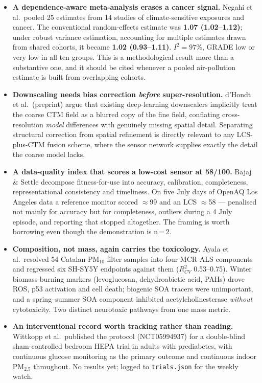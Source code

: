 \documentclass[10pt]{article}
\begin{document}
\footnotesize
\begin{itemize}
\item \textbf{A dependence-aware meta-analysis erases a cancer signal.} Negahi et al.\
pooled 25 estimates from 14 studies of climate-sensitive exposures and cancer. The
conventional random-effects estimate was \textbf{1.07 (1.02--1.12)}; under robust
variance estimation, accounting for multiple estimates drawn from shared cohorts, it
became \textbf{1.02 (0.93--1.11)}. $I^2 = 97\%$, GRADE low or very low in all ten groups.
This is a methodological result more than a substantive one, and it should be cited
whenever a pooled air-pollution estimate is built from overlapping cohorts.

\item \textbf{Downscaling needs bias correction \emph{before} super-resolution.}
d'Hondt et al.\ (preprint) argue that existing deep-learning downscalers implicitly treat
the coarse CTM field as a blurred copy of the fine field, conflating cross-resolution
\emph{model} differences with genuinely missing spatial detail. Separating structural
correction from spatial refinement is directly relevant to any LCS-plus-CTM fusion
scheme, where the sensor network supplies exactly the detail the coarse model lacks.

\item \textbf{A data-quality index that scores a low-cost sensor at 58/100.} Bajaj \&
Settle decompose fitness-for-use into accuracy, calibration, completeness,
representational consistency and timeliness. On five July days of OpenAQ Los Angeles data
a reference monitor scored $\approx$99 and an LCS $\approx$58 --- penalised not mainly for
accuracy but for completeness, outliers during a 4 July episode, and reporting that
stopped altogether. The framing is worth borrowing even though the demonstration is
n$\,$=$\,$2.

\item \textbf{Composition, not mass, again carries the toxicology.} Ayala et al.\ resolved
54 Catalan PM$_{10}$ filter samples into four MCR-ALS components and regressed six
SH-SY5Y endpoints against them ($R^2_{CV}$ 0.53--0.75). Winter biomass-burning markers
(levoglucosan, dehydroabietic acid, PAHs) drove ROS, p53 activation and cell death;
biogenic SOA tracers were unimportant, and a spring--summer SOA component inhibited
acetylcholinesterase \emph{without} cytotoxicity. Two distinct neurotoxic pathways from
one mass metric.

\item \textbf{An interventional record worth tracking rather than reading.} Wittkopp et
al.\ published the protocol (NCT05994937) for a double-blind sham-controlled bedroom HEPA
trial in adults with prediabetes, with continuous glucose monitoring as the primary
outcome and continuous indoor PM$_{2.5}$ throughout. No results yet; logged to
\texttt{trials.json} for the weekly watch.
\end{itemize}
\end{document}
